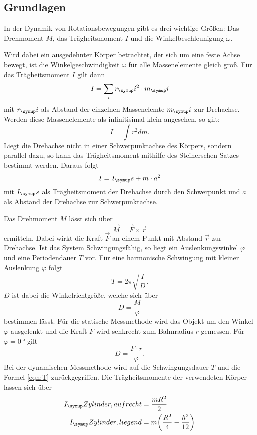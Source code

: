 \subsection{Grundlagen}
In der Dynamik von Rotationsbewegungen gibt es drei wichtige Größen:
Das Drehmoment $M$, das Trägheitsmoment $I$ und die Winkelbeschleunigung $\dot
\omega$.

Wird dabei ein ausgedehnter Körper betrachtet, der sich um eine feste Achse bewegt,
ist die Winkelgeschwindigkeit $\omega$ für alle Massenelemente gleich groß.
Für das Trägheitsmoment $I$ gilt dann
\begin{equation}
  I = \sum_i r_\su{i}^2 \cdot m_\su{i}
\end{equation}
mit $r_\su{i}$ als Abstand der einzelnen Massenelemte $m_\su{i}$ zur Drehachse.
Werden diese Massenelemente als infinitisimal klein angesehen, so gilt:
\begin{equation}
  I = \int r^2dm.
\end{equation}
Liegt die Drehachse nicht in einer Schwerpunktachse des Körpers, sondern parallel dazu,
so kann das Trägheitsmoment mithilfe des Steinerschen Satzes bestimmt werden.
Daraus folgt
\begin{equation}
  I = I_\su{s} + m \cdot a^2
\end{equation}
mit $I_\su{s}$ als Trägheitsmoment der Drehachse durch den Schwerpunkt und $a$ als
Abstand der Drehachse zur Schwerpunktachse.

Das Drehmoment $M$ lässt sich über
\begin{equation}
  \vec{M} = \vec{F} \times \vec{r} \label{eqn:M}
\end{equation}
ermitteln. Dabei wirkt die Kraft $\vec{F}$ an einem Punkt mit Abstand $\vec{r}$
zur Drehachse.
Ist das System Schwingungsfähig, so liegt ein Auslenkungswinkel $\varphi$ und eine
Periodendauer $T$ vor. Für eine harmonische Schwingung mit kleiner Auslenkung $\varphi$
folgt
\begin{equation}
  T = 2\pi\sqrt{\frac{I}{D}}. \label{eqn:T}
\end{equation}
$D$ ist dabei die Winkelrichtgröße, welche sich über
\begin{equation}
  D = \frac{M}{\varphi}
\end{equation}
bestimmen lässt.
Für die statische Messmethode wird das Objekt um den Winkel $\varphi$ ausgelenkt
und die Kraft $F$ wird senkrecht zum Bahnradius $r$ gemessen. Für $\varphi = 0 \,\si{\degree}$
gilt
\begin{equation}
  D = \frac{F \cdot r}{\varphi}. \label{eqn:D}
\end{equation}
Bei der dynamischen Messmethode wird auf die Schwingungsdauer $T$ und die Formel
\eqref{eqn:T} zurückgegriffen.
Die Trägheitsmomente der verwendeten Körper lassen sich über
\begin{align}
  \begin{split}
    I_\su{Zylinder, aufrecht} &= \frac{mR^2}{2} \\
    I_\su{Zylinder, liegend}  &= m\biggl(\frac{R^2}{4}-\frac{h^2}{12}\biggr)
  \end{split}
  \label{eqn:ZylI}
\end{align}
\newpage
